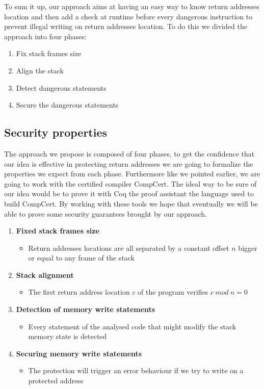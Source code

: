 \documentclass[11pt]{sdm}
\begin{document}
\hfill \break 
	To sum it up, our approach aims at having an easy way to know return addresses location and then add a check at runtime before every dangerous instruction to prevent illegal writing on return addresses location.
To do this we divided the approach into four phases:
\begin{enumerate}
	\item Fix stack frames size
	\item Align the stack
	\item Detect dangerous statements
	\item Secure the dangerous statements
\end{enumerate}


\subsection{Security properties}
\label{sub:Security properties}
	The approach we propose is composed of four phases, to get the confidence that our idea is effective in protecting return addresses we are going to formalize the properties we expect from each phase. 
Furthermore like we pointed earlier, we are going to work with the certified compiler CompCert.
The ideal way to be sure of our idea would be to prove it with Coq the proof assistant the language used to build CompCert.
By working with these tools we hope that eventually we will be able to prove some security guarantees brought by our approach.

\begin{enumerate}
	\item \textbf{Fixed stack frames size}
		\begin{itemize}
			\item Return addresses locations are all separated by a constant offset $n$ bigger or equal to any frame of the stack
		\end{itemize}
	\item \textbf{Stack alignment}
		\begin{itemize}
			\item The first return address location $c$ of the program verifies $c~mod~n=0$
		\end{itemize}
	\item \textbf{Detection of memory write statements}
		\begin{itemize}
			\item Every statement of the analysed code that might modify the stack memory state is detected
		\end{itemize}
	\item \textbf{Securing memory write statements}
		\begin{itemize}
			\item The protection will trigger an error behaviour if we try to write on a protected address
		\end{itemize}
\end{enumerate}
\end{document}
